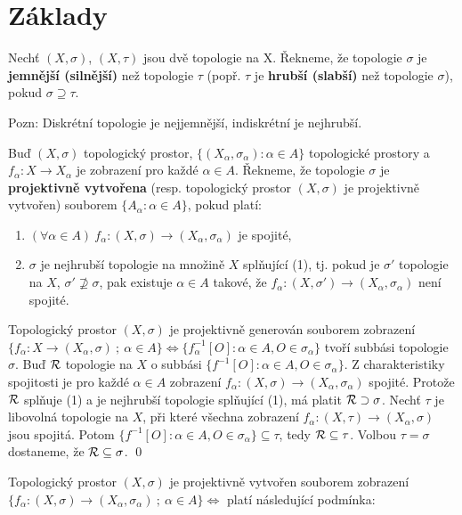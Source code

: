 \documentclass[12pt,a4paper]{article}
\begin{document}
\section{Základy}
 Nechť $(X,\sigma)$, $(X,\tau)$ jsou dvě topologie na X. Řekneme, že
topologie $\sigma$ je {\bf jemnější (silnější)} než topologie $\tau$ (popř.
$\tau$ je {\bf hrubší (slabší)} než topologie $\sigma$), pokud $\sigma
\supseteq \tau$.

Pozn: Diskrétní topologie je nejjemnější, indiskrétní je nejhrubší.

 Buď $(X,\sigma)$ topologický prostor, $\{(X_\alpha,\sigma_\alpha) : \alpha \in A\}$ topologické prostory a $f_\alpha : X \to X_\alpha$ je zobrazení pro každé $\alpha \in A$. Řekneme, že topologie $\sigma$ je {\bf projektivně vytvořena} (resp. topologický prostor $(X,\sigma)$ je projektivně vytvořen) souborem $\{A_\alpha : \alpha \in A\}$, pokud platí:
\begin{enumerate}
\item $(\forall \alpha \in A)~f_\alpha : (X,\sigma) \to (X_\alpha,
	\sigma_\alpha)$ je spojité,
\item $\sigma$ je nejhrubší topologie na množině $X$ splňující (1), tj. pokud
	je $\sigma'$ topologie na $X$, $\sigma' \not\supseteq \sigma$, pak existuje
	$\alpha \in A$ takové, že $f_\alpha : (X,\sigma') \to (X_\alpha,
	\sigma_\alpha)$ není spojité.
\end{enumerate}

\tvrzeni Topologický prostor $(X,\sigma)$ je projektivně generován souborem
	zobrazení $\{f_\alpha : X \to (X_\alpha,\sigma)~;~\alpha \in A\} \iff \{
	f_\alpha^{-1}[O] : \alpha \in A, O \in \sigma_\alpha\}$ tvoří subbási
	topologie $\sigma$.
\dukaz Buď $\mathcal{ R }$ topologie na $X$ o subbási $\{f^{-1}[O] : \alpha \in A, O \in \sigma_\alpha\}$. Z charakteristiky spojitosti je pro každé $\alpha \in A$ zobrazení $f_\alpha : (X,\sigma) \to (X_\alpha,\sigma_\alpha)$ spojité. Protože $\mathcal{ R }$ splňuje (1) a je nejhrubší topologie splňující (1), má platit $\mathcal{ R } \supset \sigma$. Nechť $\tau$ je libovolná topologie na $X$, při které všechna zobrazení $f_\alpha : (X,\tau) \to (X_\alpha,\sigma)$ jsou spojitá. Potom $\{f^{-1}[O] : \alpha \in A, O \in \sigma_\alpha\} \subseteq \tau$, tedy $\mathcal{ R } \subseteq \tau$. Volbou $\tau = \sigma$ dostaneme, že $\mathcal{ R } \subseteq \sigma$.
\qed

\veta Topologický prostor $(X, \sigma)$ je projektivně vytvořen souborem zobrazení $\{f_\alpha : (X,\sigma) \to (X_\alpha, \sigma_\alpha)~;~\alpha \in A\} \iff$ platí následující podmínka:
\end{document}
